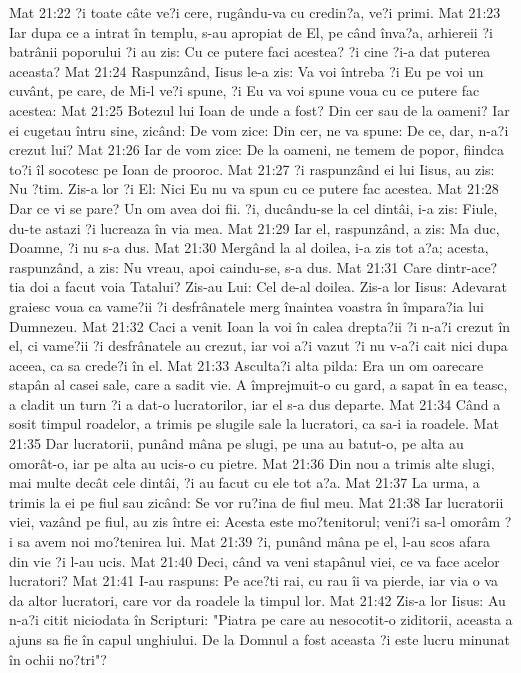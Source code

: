 Mat 21:22  ?i toate câte ve?i cere, rugându-va cu credin?a, ve?i primi.
Mat 21:23  Iar dupa ce a intrat în templu, s-au apropiat de El, pe când înva?a, arhiereii ?i batrânii poporului ?i au zis: Cu ce putere faci acestea? ?i cine ?i-a dat puterea aceasta?
Mat 21:24  Raspunzând, Iisus le-a zis: Va voi întreba ?i Eu pe voi un cuvânt, pe care, de Mi-l ve?i spune, ?i Eu va voi spune voua cu ce putere fac acestea:
Mat 21:25  Botezul lui Ioan de unde a fost? Din cer sau de la oameni? Iar ei cugetau întru sine, zicând: De vom zice: Din cer, ne va spune: De ce, dar, n-a?i crezut lui?
Mat 21:26  Iar de vom zice: De la oameni, ne temem de popor, fiindca to?i îl socotesc pe Ioan de prooroc.
Mat 21:27  ?i raspunzând ei lui Iisus, au zis: Nu ?tim. Zis-a lor ?i El: Nici Eu nu va spun cu ce putere fac acestea.
Mat 21:28  Dar ce vi se pare? Un om avea doi fii. ?i, ducându-se la cel dintâi, i-a zis: Fiule, du-te astazi ?i lucreaza în via mea.
Mat 21:29  Iar el, raspunzând, a zis: Ma duc, Doamne, ?i nu s-a dus.
Mat 21:30  Mergând la al doilea, i-a zis tot a?a; acesta, raspunzând, a zis: Nu vreau, apoi caindu-se, s-a dus.
Mat 21:31  Care dintr-ace?tia doi a facut voia Tatalui? Zis-au Lui: Cel de-al doilea. Zis-a lor Iisus: Adevarat graiesc voua ca vame?ii ?i desfrânatele merg înaintea voastra în împara?ia lui Dumnezeu.
Mat 21:32  Caci a venit Ioan la voi în calea drepta?ii ?i n-a?i crezut în el, ci vame?ii ?i desfrânatele au crezut, iar voi a?i vazut ?i nu v-a?i cait nici dupa aceea, ca sa crede?i în el.
Mat 21:33  Asculta?i alta pilda: Era un om oarecare stapân al casei sale, care a sadit vie. A împrejmuit-o cu gard, a sapat în ea teasc, a cladit un turn ?i a dat-o lucratorilor, iar el s-a dus departe.
Mat 21:34  Când a sosit timpul roadelor, a trimis pe slugile sale la lucratori, ca sa-i ia roadele.
Mat 21:35  Dar lucratorii, punând mâna pe slugi, pe una au batut-o, pe alta au omorât-o, iar pe alta au ucis-o cu pietre.
Mat 21:36  Din nou a trimis alte slugi, mai multe decât cele dintâi, ?i au facut cu ele tot a?a.
Mat 21:37  La urma, a trimis la ei pe fiul sau zicând: Se vor ru?ina de fiul meu.
Mat 21:38  Iar lucratorii viei, vazând pe fiul, au zis între ei: Acesta este mo?tenitorul; veni?i sa-l omorâm ?i sa avem noi mo?tenirea lui.
Mat 21:39  ?i, punând mâna pe el, l-au scos afara din vie ?i l-au ucis.
Mat 21:40  Deci, când va veni stapânul viei, ce va face acelor lucratori?
Mat 21:41  I-au raspuns: Pe ace?ti rai, cu rau îi va pierde, iar via o va da altor lucratori, care vor da roadele la timpul lor.
Mat 21:42  Zis-a lor Iisus: Au n-a?i citit niciodata în Scripturi: "Piatra pe care au nesocotit-o ziditorii, aceasta a ajuns sa fie în capul unghiului. De la Domnul a fost aceasta ?i este lucru minunat în ochii no?tri"?
